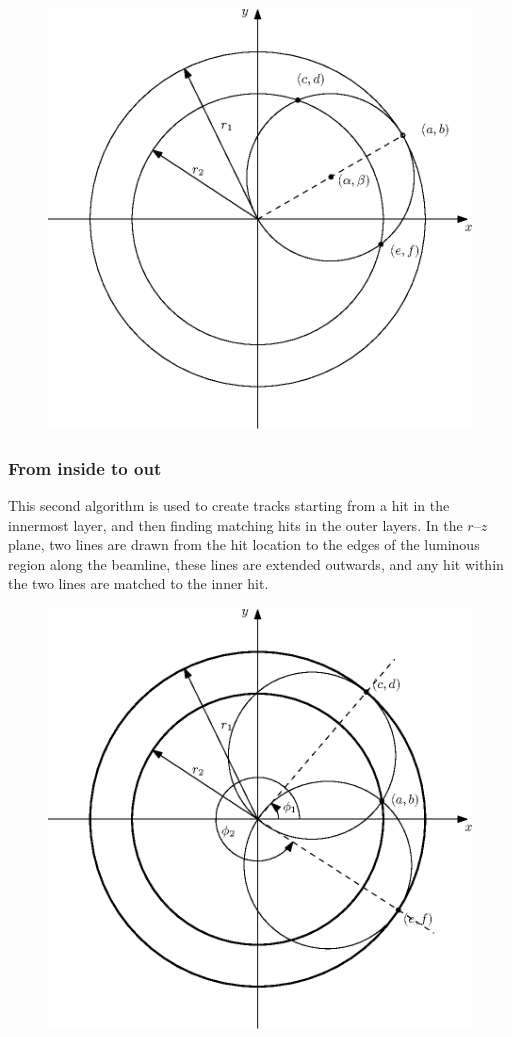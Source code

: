 \documentclass[a4paper, 12pt]{article}
\begin{document}
\begin{figure}
  \centering
  \includegraphics[width=0.5\linewidth]{images/geometry2.eps}
  \caption{}
  \label{fig:circles2}
\end{figure}

\subsubsection{From inside to out}
This second algorithm is used to create tracks starting from a hit in the innermost layer, 
and then finding matching hits in the outer layers. 
In the $r$--$z$ plane, two lines are drawn from the hit location to the edges of the luminous region along the beamline, these lines are extended outwards, and any hit within the two lines are matched
to the inner hit. 

\begin{figure}
  \centering
  \includegraphics[width=0.5\linewidth]{images/geometry3.eps}
  \caption{}
  \label{fig:circles3}
\end{figure}
\end{document}
